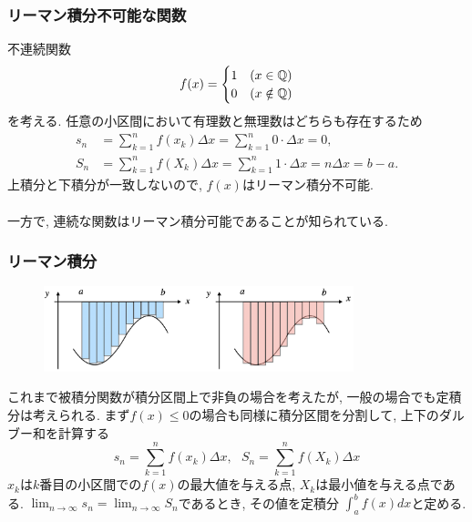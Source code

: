 \begin{frame}
\frametitle{リーマン積分不可能な関数}

不連続関数
$$
f(x)=
\begin{cases}
1 & (x \in \mathbb{Q})\\
0 & (x \notin \mathbb{Q})
\end{cases}
$$
を考える. 
任意の小区間において有理数と無理数はどちらも存在するため
\begin{align*}
s_n &= \sum_{k=1}^nf(x_k)\Delta x = \sum_{k=1}^n 0 \cdot \Delta x =0, \\
S_n &= \sum_{k=1}^nf(X_k)\Delta x = \sum_{k=1}^n 1 \cdot \Delta x =n \Delta x = b-a. 
\end{align*}
上積分と下積分が一致しないので, $f(x)$はリーマン積分不可能. \\
\ \\

一方で, 連続な関数はリーマン積分可能であることが知られている. 
\end{frame}





\begin{frame}
\frametitle{リーマン積分}

\vspace{-3mm}

\begin{figure}[htbp]
 \begin{center} 
  \includegraphics[width=90mm]{calculus12/RiemannSum4.png}
 \end{center}
\end{figure}

\vspace{-3mm}

これまで被積分関数が積分区間上で非負の場合を考えたが, 一般の場合でも定積分は考えられる. 
まず$f(x) \le 0$の場合も同様に積分区間を分割して, 上下のダルブー和を計算する
$$
s_n = \sum_{k=1}^nf(x_k)\Delta x, \ \ \ S_n = \sum_{k=1}^nf(X_k)\Delta x
$$
$x_k$は$k$番目の小区間での$f(x)$の最大値を与える点, $X_k$は最小値を与える点である. 
$\displaystyle \lim_{n\to \infty} s_n = \lim_{n\to \infty} S_n$であるとき, その値を定積分
$\int_a^b f(x)dx$と定める. 


\end{frame}



